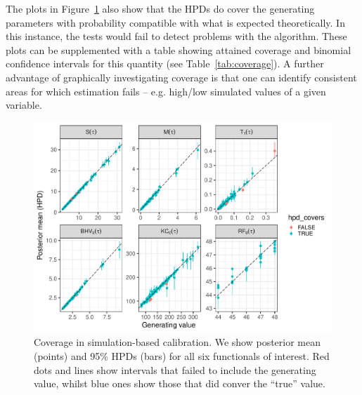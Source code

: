 \documentclass[oneside]{article}
\begin{document}
The plots in Figure~\ref{fig:phylo_calibration} also show that the HPDs do cover the generating parameters with probability compatible with what is expected theoretically.
In this instance, the tests would fail to detect problems with the algorithm.
These plots can be supplemented with a table showing attained coverage and binomial confidence intervals for this quantity (see Table~\ref{tab:coverage}).
A further advantage of graphically investigating coverage is that one can identify consistent areas for which estimation fails -- e.g. high/low simulated values of a given variable.

\begin{figure}
 \includegraphics[width=\textwidth]{../figures/coverage.pdf}
    \caption{Coverage in simulation-based calibration.
    We show posterior mean (points) and 95\% HPDs (bars) for all six functionals of interest.
    Red dots and lines show intervals that failed to include the generating value, whilst blue ones show those that did conver the ``true'' value.}
  \label{fig:phylo_calibration}
\end{figure}

  
\end{document}
